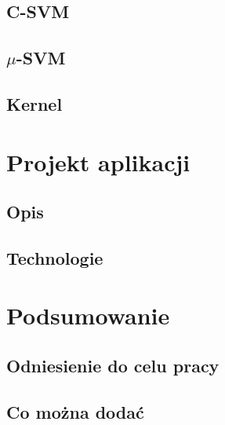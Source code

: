 \documentclass[paper=a4, fontsize=11pt]{scrartcl} %
\numberwithin{equation}{section} %
\numberwithin{figure}{section} %
\begin{document}
\subsection{C-SVM}
\subsection{$\mu$-SVM}
\subsection{Kernel}
\section{Projekt aplikacji}
\subsection{Opis}
\subsection{Technologie}
\subsection{}
\section{Podsumowanie}
\subsection{Odniesienie do celu pracy}
\subsection{Co można dodać}
\end{document}
